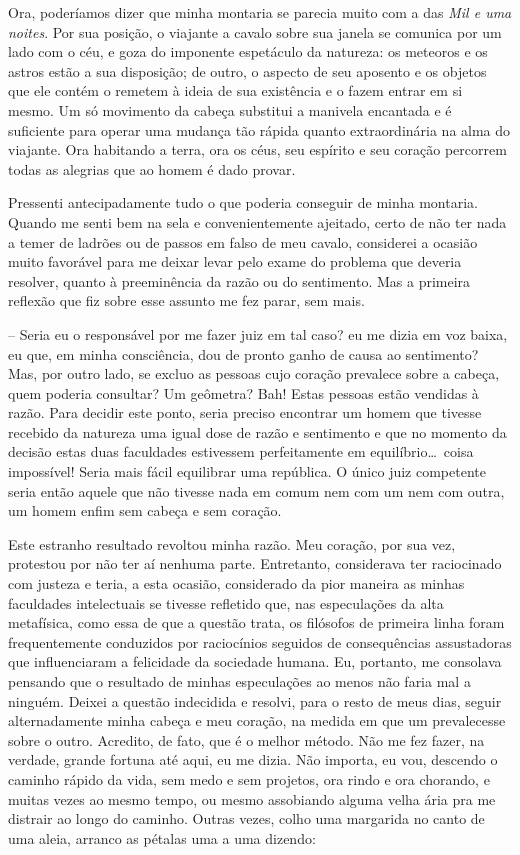  Ora, poderíamos dizer que minha montaria se parecia muito com a das
\textit{Mil e uma noites}. Por sua posição, o viajante a cavalo sobre
sua janela se comunica por um lado com o céu, e goza do imponente
espetáculo da natureza: os meteoros e os astros estão a sua disposição;
de outro, o aspecto de seu aposento e os objetos que ele contém o
remetem à ideia de sua existência e o fazem entrar em si mesmo. Um só
movimento da cabeça substitui a manivela encantada e é suficiente para
operar uma mudança tão rápida quanto extraordinária na alma do
viajante. Ora habitando a terra, ora os céus, seu espírito e seu
coração percorrem todas as alegrias que ao homem é dado provar.

 Pressenti antecipadamente tudo o que poderia conseguir de minha
montaria. Quando me senti bem na sela e convenientemente ajeitado,
certo de não ter nada a temer de ladrões ou de passos em falso de meu
cavalo, considerei a ocasião muito favorável para me deixar levar pelo
exame do problema que deveria resolver, quanto à preeminência da razão
ou do sentimento. Mas a primeira reflexão que fiz sobre esse assunto me
fez parar, sem mais. 

-- Seria eu o responsável por me fazer juiz em tal caso? eu me dizia em
voz baixa, eu que, em minha consciência, dou de pronto ganho de causa
ao sentimento? Mas, por outro lado, se excluo as pessoas cujo coração
prevalece sobre a cabeça, quem poderia consultar? Um geômetra? Bah!
Estas pessoas estão vendidas à razão. Para decidir este ponto, seria
preciso encontrar um homem que tivesse recebido da natureza uma igual
dose de razão e sentimento e que no momento da decisão estas duas
faculdades estivessem perfeitamente em equilíbrio\ldots\ coisa impossível!
Seria mais fácil equilibrar uma república. O único juiz competente
seria então aquele que não tivesse nada em comum nem com um nem com
outra, um homem enfim sem cabeça e sem coração.

Este estranho resultado revoltou minha razão. Meu coração, por sua vez,
protestou por não ter aí nenhuma parte. Entretanto, considerava ter
raciocinado com justeza e teria, a esta ocasião, considerado da pior
maneira as minhas faculdades intelectuais se tivesse refletido que, nas
especulações da alta metafísica, como essa de que a questão trata, os
filósofos de primeira linha foram frequentemente conduzidos por
raciocínios seguidos de consequências assustadoras que influenciaram a
felicidade da sociedade humana. Eu, portanto, me consolava pensando que
o resultado de minhas especulações ao menos não faria mal a ninguém.
Deixei a questão indecidida e resolvi, para o resto de meus dias,
seguir alternadamente minha cabeça e meu coração, na medida em que um
prevalecesse sobre o outro. Acredito, de fato, que é o melhor método.
Não me fez fazer, na verdade, grande fortuna até aqui, eu me dizia. Não
importa, eu vou, descendo o caminho rápido da vida, sem medo e sem
projetos, ora rindo e ora chorando, e muitas vezes ao mesmo tempo, ou
mesmo assobiando alguma velha ária pra me distrair ao longo do caminho.
Outras vezes, colho uma margarida no canto de uma aleia, arranco as
pétalas uma a uma dizendo: 

